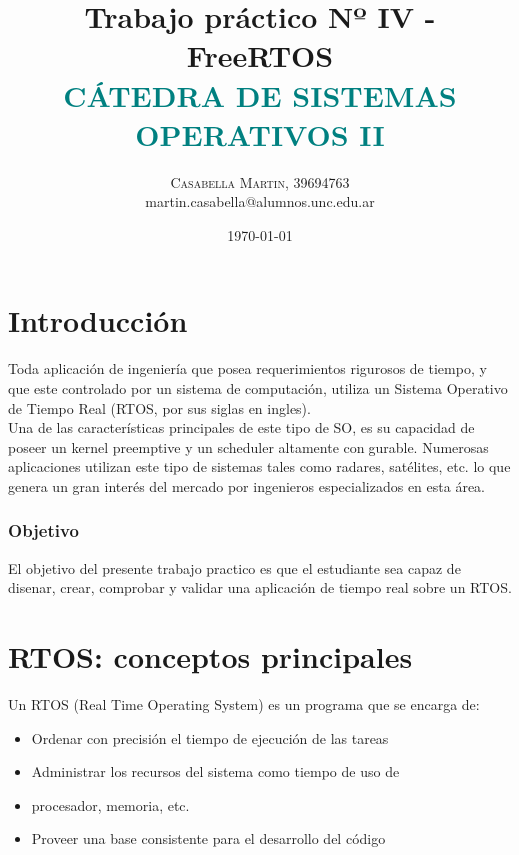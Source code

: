 \documentclass{article}
\title{\bigskip \bigskip \bigskip \bigskip \vspace{-15mm}\fontsize{35pt}{35pt}\selectfont\textbf{{Trabajo práctico Nº IV - FreeRTOS\\}}
\bigskip \bigskip \fontsize{18pt}{10pt}\selectfont\textbf{\textcolor{teal}{CÁTEDRA DE SISTEMAS OPERATIVOS II}}\bigskip\bigskip \bigskip\bigskip \bigskip}\bigskip\bigskip \bigskip\bigskip \bigskip %
\author{
\large
{
\textsc{Casabella Martin, 39694763 }}\\[2mm]
  martin.casabella@alumnos.unc.edu.ar\\[2mm]
\bigskip\bigskip \bigskip \bigskip\bigskip \bigskip
}
\date{\Huge\today}
\begin{document}
\maketitle
\clearpage


\renewcommand{\figurename}{\textbf{\textcolor{Orange}{Figura}}}
\renewcommand\thefigure{\textbf{\textcolor{Orange}{\arabic{figure}}}}

\tableofcontents

\clearpage


\section{Introducción}
Toda aplicación de ingeniería que posea requerimientos rigurosos de tiempo, y
que este controlado por un sistema de computación, utiliza un Sistema Operativo
de Tiempo Real (RTOS, por sus siglas en ingles). \\

Una de las características principales de este tipo de SO, es su capacidad de poseer un kernel preemptive y un scheduler altamente congurable. Numerosas aplicaciones utilizan este tipo de sistemas tales como  radares, satélites, etc. lo que genera un gran
interés del mercado por ingenieros especializados en esta área.\\

\subsubsection{Objetivo}
El objetivo del presente trabajo practico es que el estudiante sea capaz de
disenar, crear, comprobar y validar una aplicación de tiempo real sobre un
RTOS.\\

\section{RTOS: conceptos principales}
Un RTOS (Real Time Operating System) es un programa que se encarga
de:
\begin{itemize}
\item Ordenar con precisión el tiempo de ejecución de las tareas
\item Administrar los recursos del sistema como tiempo de uso de
\item procesador, memoria, etc. 
\item Proveer una base consistente para el desarrollo del código
\end{itemize}
\end{document}
